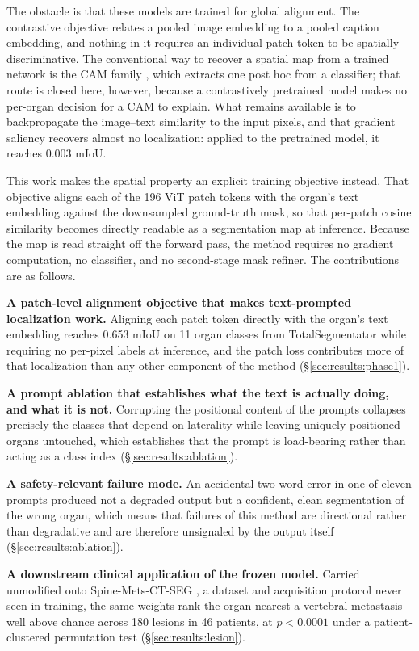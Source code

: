 The obstacle is that these models are trained for global alignment. The
contrastive objective relates a pooled image embedding to a pooled caption
embedding, and nothing in it requires an individual patch token to be spatially
discriminative. The conventional way to recover a spatial map from a trained
network is the CAM family \cite{zhou2016cam, selvaraju2017gradcam}, which
extracts one post hoc from a classifier; that route is closed here, however,
because a contrastively pretrained model makes no per-organ decision for a CAM
to explain. What remains available is to backpropagate the image--text
similarity to the input pixels, and that gradient saliency recovers almost no
localization: applied to the pretrained model, it reaches 0.003 mIoU.

This work makes the spatial property an explicit training objective instead.
That objective aligns each of the 196 ViT patch tokens with the organ's text
embedding against the downsampled ground-truth mask, so that per-patch cosine
similarity becomes directly readable as a segmentation map at inference. Because
the map is read straight off the forward pass, the method requires no gradient
computation, no classifier, and no second-stage mask refiner. The contributions
are as follows.

\textbf{A patch-level alignment objective that makes text-prompted localization
work.} Aligning each patch token directly with the organ's text embedding
reaches 0.653 mIoU on 11 organ classes from TotalSegmentator while requiring no
per-pixel labels at inference, and the patch loss contributes more of that
localization than any other component of the method
(\S\ref{sec:results:phase1}).

\textbf{A prompt ablation that establishes what the text is actually doing, and
what it is not.} Corrupting the positional content of the prompts collapses
precisely the classes that depend on laterality while leaving
uniquely-positioned organs untouched, which establishes that the prompt is
load-bearing rather than acting as a class index
(\S\ref{sec:results:ablation}).

\textbf{A safety-relevant failure mode.} An accidental two-word error in one of
eleven prompts produced not a degraded output but a confident, clean
segmentation of the wrong organ, which means that failures of this method are
directional rather than degradative and are therefore unsignaled by the output
itself (\S\ref{sec:results:ablation}).

\textbf{A downstream clinical application of the frozen model.} Carried
unmodified onto Spine-Mets-CT-SEG \cite{pieper2024spinemets}, a dataset and
acquisition protocol never seen in training, the same weights rank the organ
nearest a vertebral metastasis well above chance across 180 lesions in 46
patients, at $p < 0.0001$ under a patient-clustered permutation test
(\S\ref{sec:results:lesion}).

